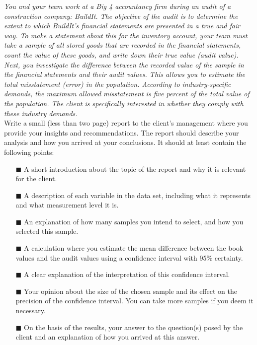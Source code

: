 \textit{You and your team work at a Big 4 accountancy firm during an audit of a construction company: BuildIt. The objective of the audit is to determine the extent to which BuildIt's financial statements are presented in a true and fair way. To make a statement about this for the inventory account, your team must take a sample of all stored goods that are recorded in the financial statements, count the value of these goods, and write down their true value (audit value). Next, you investigate the difference between the recorded value of the sample in the financial statements and their audit values. This allows you to estimate the total misstatement (error) in the population. According to industry-specific demands, the maximum allowed misstatement is five percent of the total value of the population. The client is specifically interested in whether they comply with these industry demands.} \\

Write a small (less than two page) report to the client's management where you provide your insights and recommendations. The report should describe your analysis and how you arrived at your conclusions. It should at least contain the following points: \\

\begin{itemize}
    \item[$\blacksquare$] A short introduction about the topic of the report and why it is relevant for the client.
    \item[$\blacksquare$] A description of each variable in the data set, including what it represents and what measurement level it is.
    \item[$\blacksquare$] An explanation of how many samples you intend to select, and how you selected this sample.
    \item[$\blacksquare$] A calculation where you estimate the mean difference between the book values and the audit values using a confidence interval with 95\% certainty.
    \item[$\blacksquare$] A clear explanation of the interpretation of this confidence interval.
    \item[$\blacksquare$] Your opinion about the size of the chosen sample and its effect on the precision of the confidence interval. You can take more samples if you deem it necessary.
    \item[$\blacksquare$] On the basis of the results, your answer to the question(s) posed by the client and an explanation of how you arrived at this answer.
\end{itemize}

\clearpage %